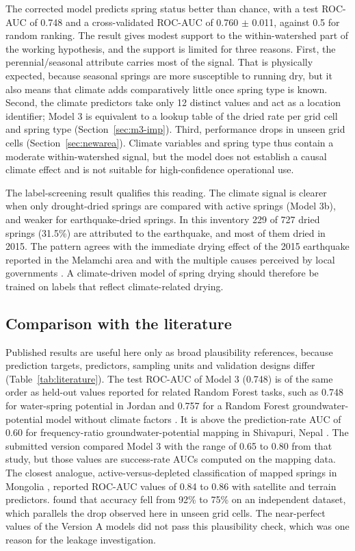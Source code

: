 \documentclass[12pt,a4paper]{article}
\begin{document}
The corrected model predicts spring status better than chance, with a test ROC-AUC of 0.748 and a cross-validated ROC-AUC of 0.760 $\pm$ 0.011, against 0.5 for random ranking. The result gives modest support to the within-watershed part of the working hypothesis, and the support is limited for three reasons. First, the perennial/seasonal attribute carries most of the signal. That is physically expected, because seasonal springs are more susceptible to running dry, but it also means that climate adds comparatively little once spring type is known. Second, the climate predictors take only 12 distinct values and act as a location identifier; Model 3 is equivalent to a lookup table of the dried rate per grid cell and spring type (Section~\ref{sec:m3-imp}). Third, performance drops in unseen grid cells (Section~\ref{sec:newarea}). Climate variables and spring type thus contain a moderate within-watershed signal, but the model does not establish a causal climate effect and is not suitable for high-confidence operational use.

The label-screening result qualifies this reading. The climate signal is clearer when only drought-dried springs are compared with active springs (Model 3b), and weaker for earthquake-dried springs. In this inventory 229 of 727 dried springs (31.5\%) are attributed to the earthquake, and most of them dried in 2015. The pattern agrees with the immediate drying effect of the 2015 earthquake reported in the Melamchi area \citep{chapagain2019} and with the multiple causes perceived by local governments \citep{thapa2023}. A climate-driven model of spring drying should therefore be trained on labels that reflect climate-related drying.

\subsection{Comparison with the literature}\label{sec:compare-lit}

Published results are useful here only as broad plausibility references, because prediction targets, predictors, sampling units and validation designs differ (Table~\ref{tab:literature}). The test ROC-AUC of Model 3 (0.748) is of the same order as held-out values reported for related Random Forest tasks, such as 0.748 for water-spring potential in Jordan \citep{alshabeeb2023} and 0.757 for a Random Forest groundwater-potential model without climate factors \citep{guo2023}. It is above the prediction-rate AUC of 0.60 for frequency-ratio groundwater-potential mapping in Shivapuri, Nepal \citep{upadhyaya2024}. The submitted version compared Model 3 with the range of 0.65 to 0.80 from that study, but those values are success-rate AUCs computed on the mapping data. The closest analogue, active-versus-depleted classification of mapped springs in Mongolia \citep{ishikawa2025}, reported ROC-AUC values of 0.84 to 0.86 with satellite and terrain predictors. \citet{niraula2021} found that accuracy fell from 92\% to 75\% on an independent dataset, which parallels the drop observed here in unseen grid cells. The near-perfect values of the Version A models did not pass this plausibility check, which was one reason for the leakage investigation.
\end{document}
